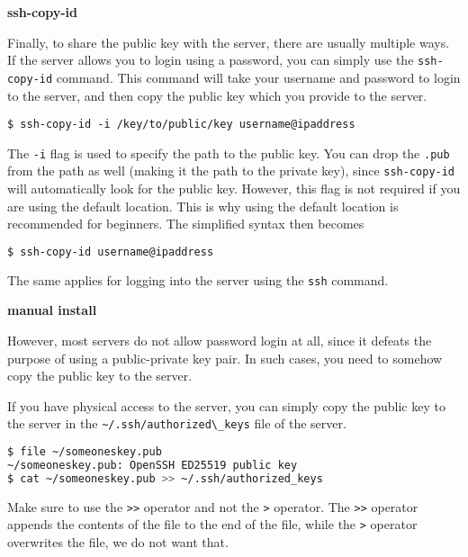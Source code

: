 \textbf{ssh-copy-id}

Finally, to share the public key with the server,
there are usually multiple ways. If the server
allows you to login using a password, you can
simply use the \lstinline|ssh-copy-id| command.
This command will take your username and password
to login to the server, and then copy the public
key which you provide to the server.

\begin{lstlisting}
$ ssh-copy-id -i /key/to/public/key username@ipaddress
\end{lstlisting}

\begin{remark}
  The \lstinline|-i| flag is used to specify the path
  to the public key. You can drop the \lstinline|.pub|
  from the path as well (making it the path to the
  private key), since \lstinline|ssh-copy-id| will
  automatically look for the public key.
  However, this flag is not required if you
  are using the default location.
  This is why using the default location is
  recommended for beginners.
  The simplified syntax then becomes
  \begin{lstlisting}[language=bash]
  $ ssh-copy-id username@ipaddress \end{lstlisting}
  The same applies for logging into the server
  using the \lstinline|ssh| command.
\end{remark}

\textbf{manual install}

However, most servers do not allow password login
at all, since it defeats the purpose of using
a public-private key pair. In such cases, you
need to somehow copy the public key to the server.

If you have physical access to the server, you
can simply copy the public key to the server
in the \lstinline|~/.ssh/authorized\_keys| file
of the server.

\begin{lstlisting}[language=bash]
$ file ~/someoneskey.pub
~/someoneskey.pub: OpenSSH ED25519 public key
$ cat ~/someoneskey.pub >> ~/.ssh/authorized_keys
\end{lstlisting}

\begin{remark}
  Make sure to use the \lstinline|>>| operator and
  not the \lstinline|>| operator. The \lstinline|>>|
  operator appends the contents of the file to
  the end of the file, while the \lstinline|>|
  operator overwrites the file, we do not want that.
\end{remark}

